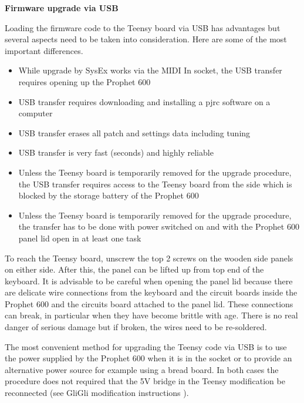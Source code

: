 \textbf{Firmware upgrade via USB}

Loading the firmware code to the Teensy board via USB has advantages but several aspects need to be taken into consideration. Here are some of the most important differences.

\begin{itemize}
  \item While upgrade by SysEx works via the MIDI In socket, the USB transfer requires opening up the Prophet 600
  \item USB transfer requires downloading and installing a pjrc software on a computer    
  \item USB transfer erases all patch and settings data including tuning
  \item USB transfer is very fast (seconds) and highly reliable
  \item Unless the Teensy board is temporarily removed for the upgrade procedure, the USB transfer requires access to the Teensy board from the side which is blocked by the storage battery of the Prophet 600
  \item Unless the Teensy board is temporarily removed for the upgrade procedure, the transfer has to be done with power switched on and with the Prophet 600 panel lid open in at least one task 
\end{itemize}

To reach the Teensy board, unscrew the top 2 screws on the wooden side panels on either side. After this, the panel can be lifted up from top end of the keyboard. It is advisable to be careful when opening the panel lid because there are delicate wire connections from the keyboard and the circuit boards inside the Prophet 600 and the circuits board attached to the panel lid. These connections can break, in particular when they have become brittle with age. There is no real danger of serious damage but if broken, the wires need to be re-soldered.


The most convenient method for upgrading the Teensy code via USB is to use the power supplied by the Prophet 600 when it is in the socket or to provide an alternative power source for example using a bread board. In both cases the procedure does not required that the 5V bridge in the Teensy modification be reconnected (see GliGli modification instructions \cite{modinstructions}).

